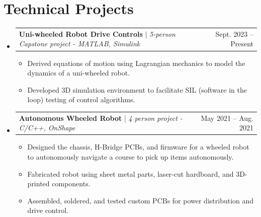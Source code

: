 \documentclass[letterpaper,11pt]{article}
\makeatletter
\newcommand{\resumeItem}[1]{
  \item\small{
    {#1 \vspace{-2pt}}
  }
}
\newcommand{\resumeProjectHeading}[2]{
    \item
    \begin{tabular*}{0.97\textwidth}{l@{\extracolsep{\fill}}r}
      \small#1 & #2 \\
    \end{tabular*}\vspace{-7pt}
}
\newcommand{\resumeSubHeadingListStart}{\begin{itemize}[leftmargin=0.15in, label={}]}
\newcommand{\resumeSubHeadingListEnd}{\end{itemize}}
\newcommand{\resumeItemListStart}{\begin{itemize}}
\newcommand{\resumeItemListEnd}{\end{itemize}\vspace{-5pt}}
\makeatother
\begin{document}
\section{Technical Projects}
    \resumeSubHeadingListStart
        \resumeProjectHeading
          {\textbf{Uni-wheeled Robot Drive Controls}
          $|$ \emph{5-person Capstone project - MATLAB, Simulink}
          }{Sept. 2023 -- Present}
          \resumeItemListStart
            \resumeItem{Derived equations of motion using Lagrangian mechanics to model the dynamics of a uni-wheeled robot.}
            \resumeItem{Developed 3D simulation environment to facilitate SIL (software in the loop) testing of control algorithms.}
          \resumeItemListEnd
      \resumeProjectHeading
          {\textbf{Autonomous Wheeled Robot}
          $|$ \emph{4 person project - C/C++, OnShape}
          }{May 2021 -- Aug. 2021}
          \resumeItemListStart
            \resumeItem{Designed the chassis, H-Bridge PCBs, and firmware for a wheeled robot to autonomously navigate a course to pick up items autonomously.}
            \resumeItem{Fabricated robot using sheet metal parts, laser-cut hardboard, and 3D-printed components.}
            \resumeItem{Assembled, soldered, and tested custom PCBs for power distribution and drive control.}
          \resumeItemListEnd
    \resumeSubHeadingListEnd
\end{document}
